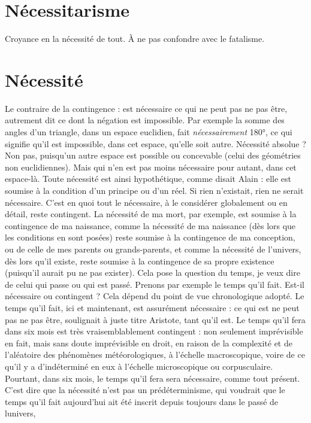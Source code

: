 \section{Nécessitarisme}
Croyance en la nécessité de tout. À ne pas confondre
avec le fatalisme.

\section{Nécessité}
Le contraire de la contingence : est nécessaire ce qui ne peut
pas ne pas être, autrement dit ce dont la négation est impossible. 
Par exemple la somme des angles d’un triangle, dans un espace euclidien,
fait {\it nécessairement} 180°, ce qui signifie qu’il est impossible, dans cet espace,
qu’elle soit autre. Nécessité absolue ? Non pas, puisqu’un autre espace est possible
ou concevable (celui des géométries non euclidiennes). Mais qui n’en est
pas moins nécessaire pour autant, dans cet espace-là. Toute nécessité est ainsi
hypothétique, comme disait Alain : elle est soumise à la condition d’un principe
ou d’un réel. Si rien n’existait, rien ne serait nécessaire. C’est en quoi tout
le nécessaire, à le considérer globalement ou en détail, reste contingent. La
nécessité de ma mort, par exemple, est soumise à la contingence de ma naissance,
comme la nécessité de ma naissance (dès lors que les conditions en sont
posées) reste soumise à la contingence de ma conception, ou de celle de mes
parents ou grands-parents, et comme la nécessité de l’univers, dès lors qu’il
existe, reste soumise à la contingence de sa propre existence (puisqu'il aurait pu
ne pas exister). Cela pose la question du temps, je veux dire de celui qui passe
ou qui est passé. Prenons par exemple le temps qu’il fait. Est-il nécessaire ou
contingent ? Cela dépend du point de vue chronologique adopté. Le temps
qu’il fait, ici et maintenant, est assurément nécessaire : ce qui est ne peut pas ne
pas être, soulignait à juste titre Aristote, tant qu’il est. Le temps qu’il fera dans
six mois est très vraisemblablement contingent : non seulement imprévisible en
fait, mais sans doute imprévisible en droit, en raison de la complexité et de
l’aléatoire des phénomènes météorologiques, à l’échelle macroscopique, voire
de ce qu’il y a d’indéterminé en eux à l’échelle microscopique ou corpusculaire.
Pourtant, dans six mois, le temps qu’il fera sera nécessaire, comme tout présent.
C’est dire que la nécessité n’est pas un prédéterminisme, qui voudrait que le
temps qu’il fait aujourd’hui ait été inscrit depuis toujours dans le passé de lunivers,
